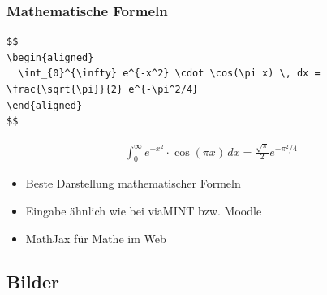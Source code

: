 \documentclass[aspectratio=169]{beamer}
\begin{document}
\begin{frame}[fragile]
\frametitle{Mathematische Formeln}

\begin{lstlisting}[language={[latex]TeX}]
$$
\begin{aligned}
  \int_{0}^{\infty} e^{-x^2} \cdot \cos(\pi x) \, dx = \frac{\sqrt{\pi}}{2} e^{-\pi^2/4}
\end{aligned}
$$
\end{lstlisting}

\vspace{1em}

$$
\begin{aligned}
  \int_{0}^{\infty} e^{-x^2} \cdot \cos(\pi x) \, dx = \frac{\sqrt{\pi}}{2} e^{-\pi^2/4}
\end{aligned}
$$

\vspace{1em}


\begin{itemize}
  \item Beste Darstellung mathematischer Formeln
  \item Eingabe ähnlich wie bei viaMINT bzw. Moodle
  \item MathJax für Mathe im Web
\end{itemize}

\end{frame}


\subsection{Bilder}
\end{document}
